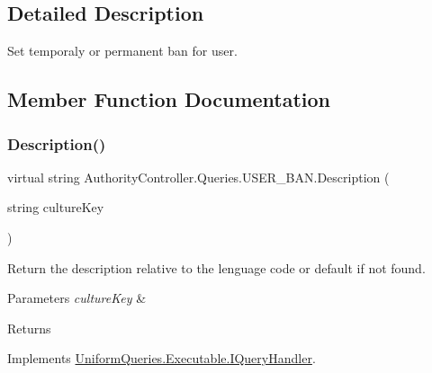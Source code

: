 \subsection{Detailed Description}
Set temporaly or permanent ban for user. 



\subsection{Member Function Documentation}
\mbox{\label{class_authority_controller_1_1_queries_1_1_u_s_e_r___b_a_n_ae0fe5998c22cf9fb76b601fbf7ee832e}} 
\subsubsection{\texorpdfstring{Description()}{Description()}}
{\footnotesize\ttfamily virtual string Authority\+Controller.\+Queries.\+U\+S\+E\+R\+\_\+\+B\+A\+N.\+Description (\begin{DoxyParamCaption}\item[{string}]{culture\+Key }\end{DoxyParamCaption})\hspace{0.3cm}{\ttfamily [virtual]}}



Return the description relative to the lenguage code or default if not found. 


\begin{DoxyParams}{Parameters}
{\em culture\+Key} & \\
\hline
\end{DoxyParams}
\begin{DoxyReturn}{Returns}

\end{DoxyReturn}


Implements \mbox{\hyperlink{interface_uniform_queries_1_1_executable_1_1_i_query_handler_ae0e55919571d5456af31298394d241a9}{Uniform\+Queries.\+Executable.\+I\+Query\+Handler}}.

\mbox{\label{class_authority_controller_1_1_queries_1_1_u_s_e_r___b_a_n_a160a12bc99edf855a2bdddb908596ecf}} 
